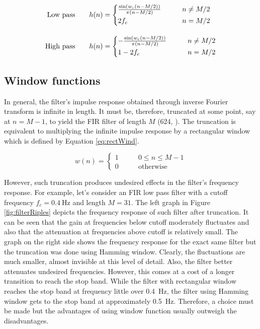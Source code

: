 \begin{align}
\text{Low pass\qquad} & h(n) = \begin{cases}
\frac{\sin \left( w_c \left( n - M / 2 \right) \right)}{\pi \left( n - M / 2 \right)} & \qquad n \neq M / 2 \\[0.2em]
2 f_c & \qquad n = M / 2
\end{cases} \label{eq:lowPass}\\[1em]
\text{High pass\qquad} & h(n) = \begin{cases}
-\frac{\sin \left( w_c \left( n - M / 2 \right) \right)}{\pi \left( n - M / 2 \right)} & \qquad n \neq M / 2 \\[0.2em]
1 - 2 f_c & \qquad n = M / 2
\end{cases}\label{eq:highPass}
\end{align}

\subsection{Window functions}
In general, the filter's impulse response obtained through inverse Fourier transform is infinite in length. It must be, therefore, truncated at some point, say at $n = M-1$, to yield the FIR filter of length $M$ (624, \cite{DSP3}). The truncation is equivalent to multiplying the infinite impulse response by a rectangular window  which is defined by Equation \ref{eq:rectWind}.

\begin{equation}
\label{eq:rectWind}
w(n) = \begin{cases}
1 &\qquad 0 \leq n \leq M-1\\
0 &\qquad \text{otherwise}
\end{cases}
\end{equation}

However, such truncation produces undesired effects in the filter's frequency response. For example, let's consider an FIR low pass filter with a cutoff frequency $f_c=\SI{0.4}{\Hz}$ and length $M=31$. The left graph in Figure \ref{fig:filterRiples} depicts the frequency response of such filter after truncation. It can be seen that the gain at frequencies below cutoff moderately fluctuates and also that the attenuation at frequencies above cutoff is relatively small. The graph on the right side shows the frequency response for the exact same filter but the truncation was done using Hamming window. Clearly, the fluctuations are much smaller, almost invisible at this level of detail. Also, the filter better attenuates undesired frequencies. However, this comes at a cost of a longer transition to reach the stop band. While the filter with rectangular window reaches the stop band at frequency little over \SI{0.4}{\Hz}, the filter using Hamming window gets to the stop band at approximately \SI{0.5}{\Hz}. Therefore, a choice must be made but the advantages of using window function usually outweigh the disadvantages.

